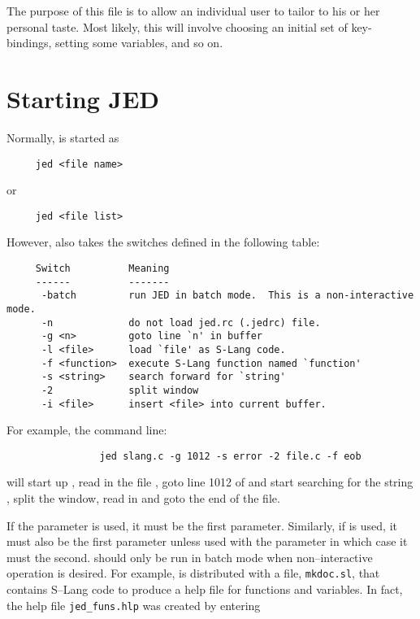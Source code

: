   The purpose of this file is to allow an individual user to tailor \jed{} to
  his or her personal taste.  Most likely, this will involve choosing an
  initial set of key-bindings, setting some variables, and so on.

\section{Starting JED}

  Normally, \jed{} is started as

\begin{verbatim}
     jed <file name>
\end{verbatim}
  or 
\begin{verbatim}
     jed <file list>
\end{verbatim}

  However, \jed{} also takes the switches defined in the following table:
\begin{verbatim}
     Switch          Meaning
     ------          -------
      -batch         run JED in batch mode.  This is a non-interactive mode.
      -n             do not load jed.rc (.jedrc) file.
      -g <n>         goto line `n' in buffer
      -l <file>      load `file' as S-Lang code.
      -f <function>  execute S-Lang function named `function'
      -s <string>    search forward for `string'
      -2             split window
      -i <file>      insert <file> into current buffer.
\end{verbatim} 

  For example, the command line:
\begin{verbatim}
                jed slang.c -g 1012 -s error -2 file.c -f eob
\end{verbatim}


  will start up \jed{}, read in the file , goto line 1012 of
   and start searching for the string , split the
  window, read in  and goto the end of the file.

  If the  parameter is used, it must be the first parameter.
  Similarly, if  is used, it must also be the first parameter unless
  used with the  parameter in which case it must the second.
  \jed{} should only be run in batch mode when non--interactive operation is
  desired. For example, \jed{} is distributed with a file, \verb|mkdoc.sl|,
  that contains S--Lang code to produce a help file for functions and
  variables.  In fact, the help file \verb|jed_funs.hlp| was created by
  entering

